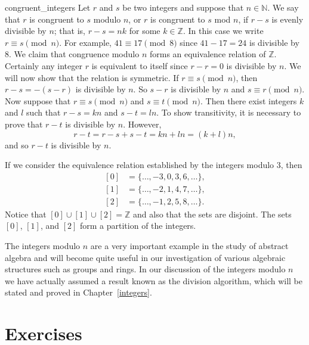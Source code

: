 \begin{example}{congruent_integers}
Let $r$ and $s$ be two integers and suppose that $n \in {\mathbb N}$.  We say that $r$ is {\bfi congruent to $s$ \bfi modulo} $n$, or $r$ is {\bfi congruent to $s$ \bfi mod} $n$, if $r - s$ is evenly divisible by $n$; that is, $r - s = nk$  for some $k \in {\mathbb Z}$.  In this case we write $r \equiv s \pmod{n}$\label{sets_a_mod_b}.  For example, \mbox{$41 \equiv 17 \pmod{ 8}$} since $41 - 17=24$ is divisible by 8.  We claim that congruence modulo $n$ forms an equivalence relation of ${\mathbb Z}$.  Certainly any integer $r$ is equivalent to itself since $r - r = 0$ is divisible by $n$.  We will now show that the relation is symmetric.  If $r \equiv s \pmod{ n}$, then $r - s = -(s -r)$ is divisible by $n$. So $s - r$ is divisible by $n$ and $s \equiv r \pmod{ n}$.  Now suppose that $r \equiv s \pmod{ n}$ and $s \equiv t \pmod{ n}$.  Then there exist integers $k$ and $l$ such that $r -s = kn$ and $s - t = ln$.  To show transitivity, it is necessary to prove that $r - t$ is divisible by $n$.  However,   
\[
r - t = r - s + s - t = kn + ln = (k + l)n,
\]
and so $r - t$ is divisible by $n$.
 
 
If we consider the equivalence relation established by the integers modulo 3, then 
\begin{align*}
{[0]} & = \{ \ldots, -3, 0, 3, 6, \ldots \}, \\
{[1]} & = \{ \ldots, -2, 1, 4, 7, \ldots \}, \\
{[2]} & = \{ \ldots, -1, 2, 5, 8, \ldots \}.
\end{align*}
Notice that $[0] \cup [1] \cup [2] = {\mathbb Z}$ and also that the sets are disjoint.  The sets $[0]$, $[1]$, and $[2]$ form a partition of the integers. 

The integers modulo $n$ are a very important example in the study of abstract algebra and will become quite useful in our investigation of various algebraic structures such as groups and rings.  In our discussion of the integers modulo $n$ we have actually assumed a result known as the division algorithm, which will be stated and proved in Chapter~\ref{integers}.
\end{example}

 
\section*{Exercises}
\exrule
 
